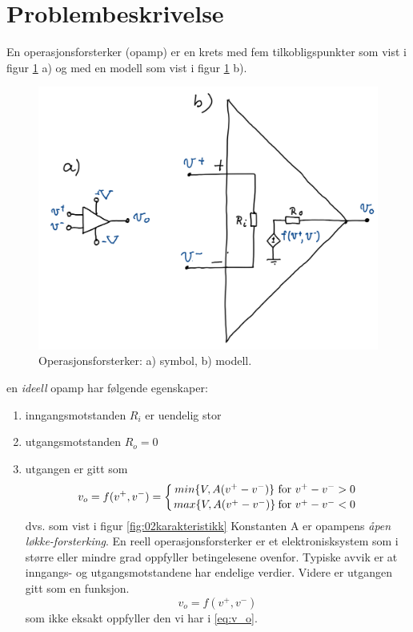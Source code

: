 \section{Problembeskrivelse}
\label{sec:issue}

En operasjonsforsterker (opamp) er en krets med fem tilkobligspunkter som vist i figur \ref{fig:01opamp} a)  og med en modell som vist i figur \ref{fig:01opamp} b).

\begin{figure}[!hbt]
	\centering
	\includegraphics[scale=0.5]{./Images/01Issue/01_opamp.png}
	\caption{Operasjonsforsterker: a) symbol, b) modell.}
	\label{fig:01opamp}
\end{figure}

en \textit{ideell} opamp har følgende egenskaper:
\begin{enumerate}
    \item inngangsmotstanden $R_i$ er uendelig stor
    \item utgangsmotstanden $R_o = 0$
    \item utgangen er gitt som \newline \begin{equation} v_o=f(v^+,v^-) = \biggl\{ {{min\{V,A(v^+-v^-)\}} \atop {max\{V,A(v^+-v^-)\}}} {{\text{for } v^+-v^->0}\atop{\text{for } v^+-v^-<0}} \label{eq:v_o} \end{equation} \newline dvs. som vist i figur \ref{fig:02karakteristikk} Konstanten A er opampens \textit{åpen løkke-forsterking}. En reell operasjonsforsterker er et elektronisksystem som i større eller mindre grad oppfyller betingelesene ovenfor. Typiske avvik er at inngangs- og utgangsmotstandene har endelige verdier. Videre er utgangen gitt som en funksjon. \newline \begin{equation} v_o=f(v^+,v^-) \end{equation} \newline som ikke eksakt oppfyller den vi har i \ref{eq:v_o}.
\end{enumerate}

